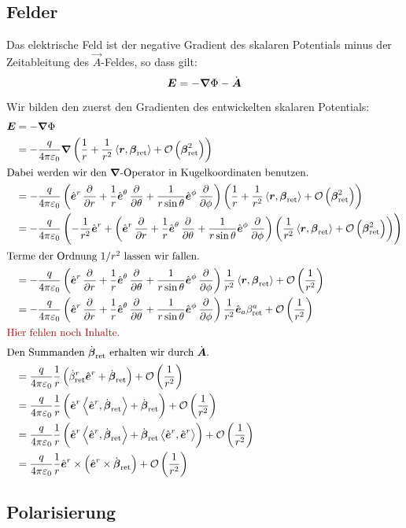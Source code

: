 \fehlt

\subsection{Felder}

Das elektrische Feld ist der negative Gradient des skalaren Potentials minus der Zeitableitung des $\vec A$-Feldes, so dass gilt:
\[
	\boldsymbol{E} = - \boldsymbol{\nabla} \Phi - \dot{\boldsymbol{A}}
\]

Wir bilden den zuerst den Gradienten des entwickelten skalaren Potentials:
\begin{align*}
	\vec E
	&= - \vnabla \Phi \\
	&= - \frac{q}{4 \pi \varepsilon_0} \vnabla \del{\frac 1r + \frac{1}{r^2}\inner{\vec r}{\vec \beta_\text{ret}} + \mathcal O\del{\vec \beta_\text{ret}^2}} \\ 
	\intertext{%
		Dabei werden wir den $\vnabla$-Operator in Kugelkoordinaten benutzen.
	}
	&= - \frac{q}{4 \pi \varepsilon_0} \del{\ev^r \dpd{}r + \frac 1r \ev^\theta \dpd{}\theta + \frac{1}{r \sin \theta} \ev^\phi \dpd{}\phi} \del{\frac 1r + \frac{1}{r^2}\inner{\vec r}{\vec \beta_\text{ret}} + \mathcal O\del{\vec \beta_\text{ret}^2}} \\ 
	&= - \frac{q}{4 \pi \varepsilon_0} \del{ - \frac 1{r^2} \ev^r + \del{\ev^r \dpd{}r + \frac 1r \ev^\theta \dpd{}\theta + \frac{1}{r \sin \theta} \ev^\phi \dpd{}\phi} \del{\frac{1}{r^2}\inner{\vec r}{\vec \beta_\text{ret}} + \mathcal O\del{\vec \beta_\text{ret}^2}}} \\ 
	\intertext{%
		Terme der Ordnung $1/r^2$ lassen wir fallen.
	}
	&= - \frac{q}{4 \pi \varepsilon_0} \del{\ev^r \dpd{}r + \frac 1r \ev^\theta \dpd{}\theta + \frac{1}{r \sin \theta} \ev^\phi \dpd{}\phi} \frac{1}{r^2}\inner{\vec r}{\vec \beta_\text{ret}} + \mathcal O\del{\frac 1{r^2}} \\ 
	&= - \frac{q}{4 \pi \varepsilon_0} \del{\ev^r \dpd{}r + \frac 1r \ev^\theta \dpd{}\theta + \frac{1}{r \sin \theta} \ev^\phi \dpd{}\phi} \frac{1}{r^2} \ev_a \beta_\text{ret}^a + \mathcal O\del{\frac 1{r^2}} \\ 
	\intertext{%
		\fehlt
	}
	\intertext{%
		Den Summanden $\dot{\vec \beta}_\text{ret}$ erhalten wir durch
		$\dot{\vec A}$.
	}
	&= \frac{q}{4 \pi \varepsilon_0} \frac 1r \del{\dot{\beta}_\text{ret}^r \ev^r + \dot{\vec \beta}_\text{ret}} + \mathcal O\del{\frac 1{r^2}} \\
	&= \frac{q}{4 \pi \varepsilon_0} \frac 1r \del{\ev^r \inner{\ev^r}{\dot{\vec \beta}_\text{ret}} + \dot{\vec \beta}_\text{ret}} + \mathcal O\del{\frac 1{r^2}} \\
&= \frac{q}{4 \pi \varepsilon_0} \frac 1r \del{\ev^r \inner{\ev^r}{\dot{\vec \beta}_\text{ret}} + \dot{\vec \beta}_\text{ret} \inner{\ev^r}{\ev^r}} + \mathcal O\del{\frac 1{r^2}} \\
	&= \frac{q}{4 \pi \varepsilon_0} \frac 1r \ev^r \times \del{\ev^r \times \dot{\vec \beta}_\text{ret}} + \mathcal O\del{\frac 1{r^2}}
\end{align*}

\fehlt

\subsection{Polarisierung}

\fehlt

%
%



